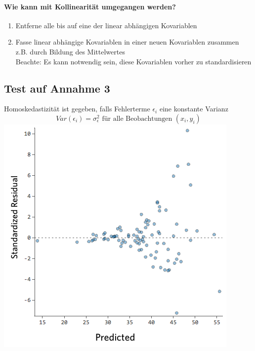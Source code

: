 \documentclass[10pt]{report}
\theoremstyle{definition}
\begin{document}
\paragraph{Wie kann mit Kollinearität umgegangen werden?}
\begin{enumerate}
	\item Entferne alle bis auf eine der linear abhängigen Kovariablen
	\item Fasse linear abhängige Kovariablen in einer neuen Kovariablen zusammen z.B. durch Bildung des Mittelwertes \\
		Beachte: Es kann notwendig sein, diese Kovariablen vorher zu standardisieren
\end{enumerate}

\subsection{Test auf Annahme 3}
Homoskedastizität ist gegeben, falls Fehlerterme $\epsilon_i$ eine konstante Varianz
\[ Var(\epsilon_i) = \sigma_{\epsilon}^{2} \text{ für alle  Beobachtungen } (x_i, y_i) \] 
\includegraphics[scale=0.5]{VorlesungenTexDateien/images/Heteroscadicity}
\end{document}
